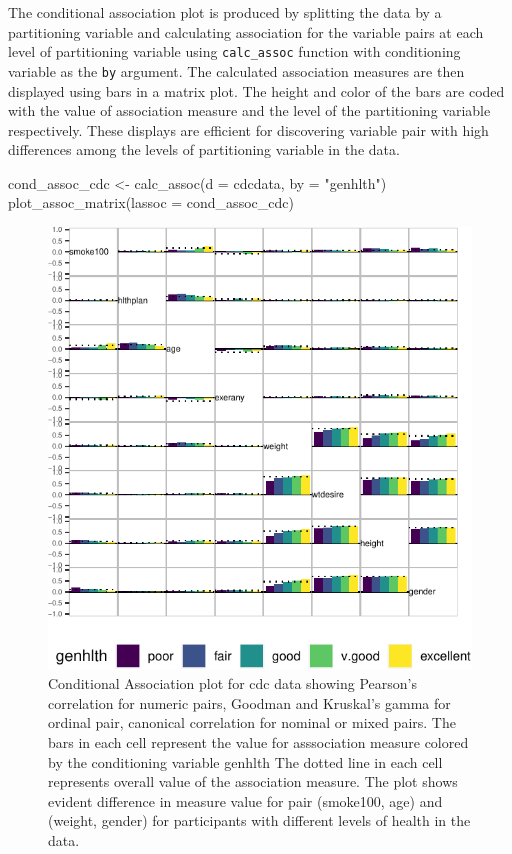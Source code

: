 The conditional association plot is produced by splitting the data by a
partitioning variable and calculating association for the variable pairs
at each level of partitioning variable using \texttt{calc\_assoc}
function with conditioning variable as the \texttt{by} argument. The
calculated association measures are then displayed using bars in a
matrix plot. The height and color of the bars are coded with the value
of association measure and the level of the partitioning variable
respectively. These displays are efficient for discovering variable pair
with high differences among the levels of partitioning variable in the
data.

\begin{Schunk}
\begin{Sinput}
cond_assoc_cdc <- calc_assoc(d = cdcdata, 
                             by = "genhlth")
plot_assoc_matrix(lassoc = cond_assoc_cdc)
\end{Sinput}
\begin{figure}

{\centering \includegraphics{rj_paper_files/figure-latex/cond-assoc-1} 

}

\caption[Conditional Association plot for cdc data showing Pearson's correlation for numeric pairs, Goodman and Kruskal's gamma for ordinal pair, canonical correlation for nominal or mixed pairs]{Conditional Association plot for cdc data showing Pearson's correlation for numeric pairs, Goodman and Kruskal's gamma for ordinal pair, canonical correlation for nominal or mixed pairs. The bars in each cell represent the value for asssociation measure colored by the conditioning variable genhlth The dotted line in each cell represents overall value of the association measure. The plot shows evident difference in measure value for pair (smoke100, age) and (weight, gender) for participants with different levels of health in the data.}\label{fig:cond-assoc}
\end{figure}
\end{Schunk}


